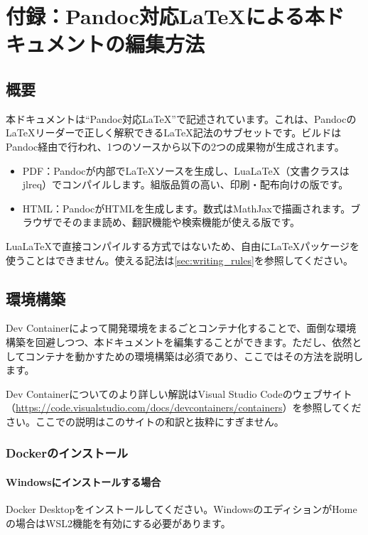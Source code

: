 \chapter{付録：Pandoc対応LaTeXによる本ドキュメントの編集方法}

\section{概要}
本ドキュメントは``Pandoc対応LaTeX''で記述されています。これは、PandocのLaTeXリーダーで正しく解釈できるLaTeX記法のサブセットです。ビルドはPandoc経由で行われ、1つのソースから以下の2つの成果物が生成されます。

\begin{itemize}
    \item PDF：Pandocが内部でLaTeXソースを生成し、LuaLaTeX（文書クラスはjlreq）でコンパイルします。組版品質の高い、印刷・配布向けの版です。
    \item HTML：PandocがHTMLを生成します。数式はMathJaxで描画されます。ブラウザでそのまま読め、翻訳機能や検索機能が使える版です。
\end{itemize}

LuaLaTeXで直接コンパイルする方式ではないため、自由にLaTeXパッケージを使うことはできません。使える記法は\cref{sec:writing_rules}を参照してください。

\section{環境構築}
Dev Containerによって開発環境をまるごとコンテナ化することで、面倒な環境構築を回避しつつ、本ドキュメントを編集することができます。ただし、依然としてコンテナを動かすための環境構築は必須であり、ここではその方法を説明します。

Dev Containerについてのより詳しい解説はVisual Studio Codeのウェブサイト（\url{https://code.visualstudio.com/docs/devcontainers/containers}）を参照してください。ここでの説明はこのサイトの和訳と抜粋にすぎません。

\subsection{Dockerのインストール}
\subsubsection{Windowsにインストールする場合}
Docker Desktopをインストールしてください。WindowsのエディションがHomeの場合はWSL2機能を有効にする必要があります。

